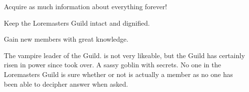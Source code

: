 \documentclass[blue]{guildcamp2}
\begin{document}
\begin{itemz}[Goals]
  \item Acquire as much information about everything forever!
  \item Keep the Loremasters Guild intact and dignified.
  \item Gain new members with great knowledge.
\end{itemz}


\begin{members}
  \member{\cVampire{}} The vampire leader of the Guild. \cVampire{\They} is not very likeable, but the Guild has certainly risen in power since \cVampire{\they} took over.
	\member{\cGoblin{}} A sassy goblin with secrets. 
	\member{\cSphinx{}} No one in the Loremasters Guild is sure whether or not \cSphinx{} is actually a member as no one has been able to decipher \cSphinx{\their} answer when asked.
	
\end{members}
\end{document}
